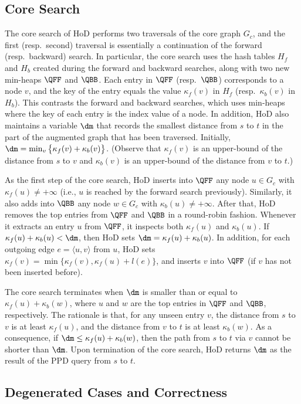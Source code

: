 \documentclass{sig-alternate}
\def\GC{G_c}
\def\HF{H_f}
\def\HB{H_b}
\def\kf{\kappa_f}
\def\kb{\kappa_b}
\begin{document}
\begin{sloppy}
\subsection{Core Search} \label{sec:p2p-core}

The core search of HoD performs two traversals of the core graph $\GC$, and the first (resp.\ second) traversal is essentially a continuation of the forward (resp.\ backward) search. In particular, the core search uses the hash tables $\HF$ and $\HB$ created during the forward and backward searches, along with two new min-heaps $\QFF$ and $\QBB$. Each entry in $\QFF$ (resp.\ $\QBB$) corresponds to a node $v$, and the key of the entry equals the value $\kf(v)$ in $\HF$ (resp.\ $\kb(v)$ in $\HB$). This contrasts the forward and backward searches, which uses min-heaps where the key of each entry is the index value of a node. In addition, HoD also maintains a variable $\dm$ that records the smallest distance from $s$ to $t$ in the part of the augmented graph that has been traversed. Initially, $\dm = \min_v \big\{\kf(v) + \kb(v)\big\}$. (Observe that $\kf(v)$ is an upper-bound of the distance from $s$ to $v$ and $\kb(v)$ is an upper-bound of the distance from $v$ to $t$.)

As the first step of the core search, HoD inserts into $\QFF$ any node $u \in \GC$ with $\kf(u) \ne +\infty$ (i.e., $u$ is reached by the forward search previously). Similarly, it also adds into $\QBB$ any node $w \in \GC$ with $\kb(u) \ne +\infty$. After that, HoD removes the top entries from $\QFF$ and $\QBB$ in a round-robin fashion. Whenever it extracts an entry $u$ from $\QFF$, it inspects both $\kf(u)$ and $\kb(u)$. If $\kf(u) + \kb(u) < \dm$, then HoD sets $\dm = \kf(u)+\kb(u)$. In addition, for each outgoing edge $e = \langle u, v\rangle$ from $u$, HoD sets $\kf(v) = \min\{\kf(v), \kf(u) + l(e)\}$, and inserts $v$ into $\QFF$ (if $v$ has not been inserted before).

The core search terminates when $\dm$ is smaller than or equal to $\kf(u) + \kb(w)$, where $u$ and $w$ are the top entries in $\QFF$ and $\QBB$, respectively. The rationale is that, for any unseen entry $v$, the distance from $s$ to $v$ is at least $\kf(u)$, and the distance from $v$ to $t$ is at least $\kb(w)$. As a consequence, if $\dm \le \kf(u) + \kb(w)$, then the path from $s$ to $t$ via $v$ cannot be shorter than $\dm$. Upon termination of the core search, HoD returns $\dm$ as the result of the PPD query from $s$ to $t$.

\subsection{Degenerated Cases and Correctness} \label{sec:p2p-proof}


\end{sloppy}
\end{document}
